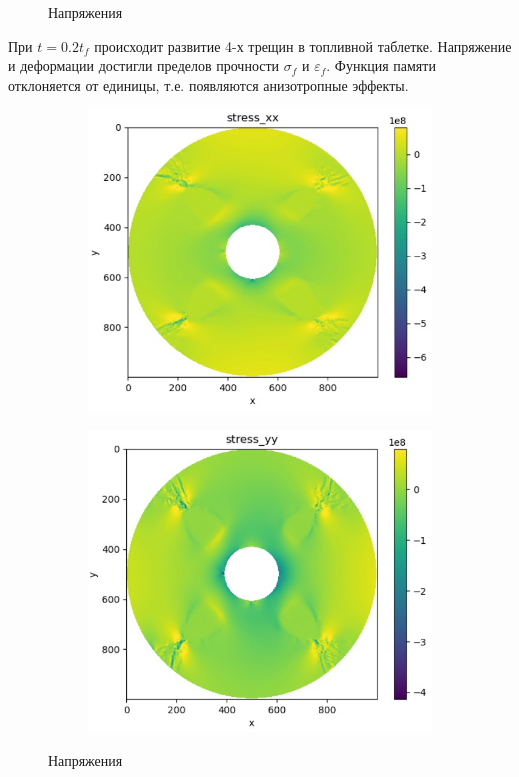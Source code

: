 \documentclass[12pt, a4paper]{article}
\begin{document}
\begin{figure}[H]
\begin{subfigure}[H]{0.38\textwidth}
	 	\end{subfigure}	
	 	\caption{Напряжения}
	 \end{figure}	
 
 При $t=0.2t_f$ происходит развитие 4-х трещин в топливной таблетке. Напряжение и деформации достигли пределов прочности $\sigma_f$ и $\varepsilon_f$. Функция памяти отклоняется от единицы, т.е. появляются анизотропные эффекты. 
  \begin{figure}[H]
 	\centering
 	\begin{subfigure}[H]{0.38\textwidth}
 		\includegraphics[width=\textwidth]{stressx_002}
 	\end{subfigure}
 	\qquad\qquad
 	\begin{subfigure}[H]{0.38\textwidth}
 		\includegraphics[width=\textwidth]{stressy_002}
 	\end{subfigure}	
 	\caption{Напряжения}
 \end{figure}	
\end{document}
